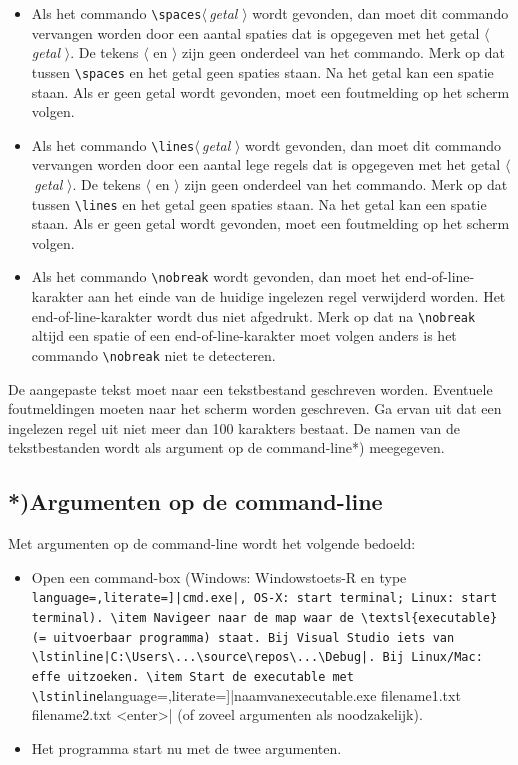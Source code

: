 \documentclass[a4paper,10pt,fleqn,twoside]{article}
\begin{document}
\begin{itemize}
\item Als het commando \lstinline|\spaces|$\langle$\,\textsl{getal} $\rangle$ wordt gevonden, dan moet dit commando vervangen worden door een aantal spaties dat is opgegeven met het getal $\langle$\,\textsl{getal} $\rangle$. De tekens $\langle$ en $\rangle$ zijn geen onderdeel van het commando. Merk op dat tussen \lstinline|\spaces| en het getal geen spaties staan. Na het getal kan een spatie staan. Als er geen getal wordt gevonden, moet een foutmelding op het scherm volgen.
\item Als het commando \lstinline|\lines|$\langle$\,\textsl{getal} $\rangle$ wordt gevonden, dan moet dit commando vervangen worden door een aantal lege regels dat is opgegeven met het getal $\langle$\,\textsl{getal} $\rangle$. De tekens $\langle$ en $\rangle$ zijn geen onderdeel van het commando. Merk op dat tussen \lstinline|\lines| en het getal geen spaties staan. Na het getal kan een spatie staan.  Als er geen getal wordt gevonden, moet een foutmelding op het scherm volgen.
\item Als het commando \lstinline|\nobreak| wordt gevonden, dan moet het end-of-line-karakter aan het einde van de huidige ingelezen regel verwijderd worden. Het end-of-line-karakter wordt dus niet afgedrukt. Merk op dat na \lstinline|\nobreak| altijd een spatie of een end-of-line-karakter moet volgen anders is het commando \lstinline|\nobreak| niet te detecteren.
\end{itemize}

De aangepaste tekst moet naar een tekstbestand geschreven worden. Eventuele foutmeldingen moeten naar het scherm worden geschreven. Ga ervan uit dat een ingelezen regel uit niet meer dan 100 karakters bestaat. De namen van de tekstbestanden wordt als argument op de command-line*) meegegeven.

\subsection{*)\space\space Argumenten op de command-line}
Met argumenten op de command-line wordt het volgende bedoeld:

\begin{itemize}
\item Open een command-box (Windows: Windowstoets-R en type \lstinline[language=,literate=]|cmd.exe|, OS-X: start terminal; Linux: start terminal).
\item Navigeer naar de map waar de \textsl{executable} (= uitvoerbaar programma) staat. Bij Visual Studio iets van \lstinline|C:\Users\...\source\repos\...\Debug|. Bij Linux/Mac: effe uitzoeken.
\item Start de executable met \lstinline[language=,literate=]|naamvanexecutable.exe filename1.txt filename2.txt <enter>| (of zoveel argumenten als noodzakelijk).
\item Het programma start nu met de twee argumenten.
\end{itemize}
\end{document}
